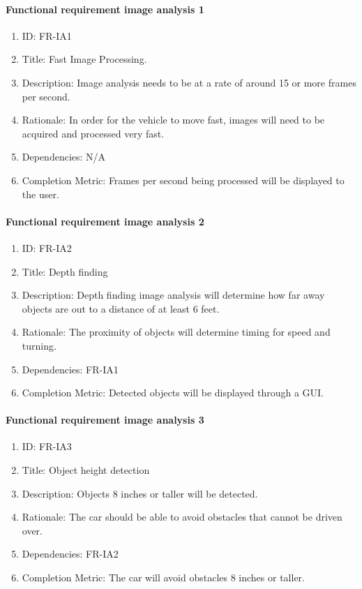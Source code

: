 \documentclass[compsoc,draftclsnofoot,onecolumn,10pt]{IEEEtran}
\begin{document}
	\paragraph{Functional requirement image analysis 1}
		\begin{enumerate}
			\item ID: FR-IA1
			\item Title: Fast Image Processing.
			\item Description: Image analysis needs to be at a rate of around 15 or more frames per second.
			\item Rationale: In order for the vehicle to move fast, images will need to be acquired and processed very fast.
			\item Dependencies: N/A
			\item Completion Metric: Frames per second being processed will be displayed to the user. 
		\end{enumerate}	

	\paragraph{Functional requirement image analysis 2}
		\begin{enumerate}
			\item ID: FR-IA2
			\item Title: Depth finding
			\item Description: Depth finding image analysis will determine how far away objects are out to a distance of at least 6 feet.
			\item Rationale: The proximity of objects will determine timing for speed and turning. 
			\item Dependencies: FR-IA1
			\item Completion Metric: Detected objects will be displayed through a GUI.
		\end{enumerate}
	
	\paragraph{Functional requirement image analysis 3}
		\begin{enumerate}
			\item ID: FR-IA3
			\item Title: Object height detection
			\item Description: Objects 8 inches or taller will be detected.
			\item Rationale: The car should be able to avoid obstacles that cannot be driven over.
			\item Dependencies: FR-IA2
			\item Completion Metric: The car will avoid obstacles 8 inches or taller.
		\end{enumerate}
\end{document}
